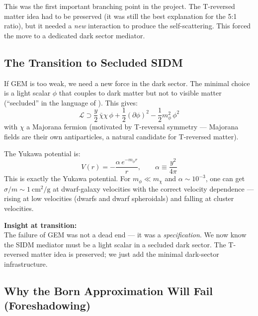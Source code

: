 \documentclass[12pt, a4paper]{article}
\begin{document}
This was the first important branching point in the project. The T-reversed matter idea had to be preserved (it was still the best explanation for the 5:1 ratio), but it needed a \emph{new} interaction to produce the self-scattering. This forced the move to a dedicated dark sector mediator.

\subsection{The Transition to Secluded SIDM}

If GEM is too weak, we need a new force in the dark sector. The minimal choice is a light scalar $\phi$ that couples to dark matter but not to visible matter (``secluded'' in the language of \cite{pospelov2008}). This gives:
\begin{equation}
  \mathcal{L} \supset \frac{y}{2}\,\bar\chi\chi\,\phi + \frac{1}{2}(\partial\phi)^2 - \frac{1}{2}m_\phi^2\,\phi^2
\end{equation}
with $\chi$ a Majorana fermion (motivated by T-reversal symmetry --- Majorana fields are their own antiparticles, a natural candidate for T-reversed matter).

The Yukawa potential is:
\begin{equation}
  V(r) = -\frac{\alpha\,e^{-m_\phi r}}{r}, \qquad \alpha \equiv \frac{y^2}{4\pi}
\end{equation}
This is exactly the Yukawa potential. For $m_\phi \ll m_\chi$ and $\alpha \sim 10^{-3}$, one can get $\sigma/m \sim 1~\text{cm}^2/\text{g}$ at dwarf-galaxy velocities with the correct velocity dependence --- rising at low velocities (dwarfs and dwarf spheroidals) and falling at cluster velocities.

\begin{insightbox}
\textbf{Insight at transition:}\\
The failure of GEM was not a dead end --- it was a \emph{specification}.
We now know the SIDM mediator must be a light scalar in a secluded dark sector.
The T-reversed matter idea is preserved; we just add the minimal dark-sector infrastructure.
\end{insightbox}

\subsection{Why the Born Approximation Will Fail (Foreshadowing)}
\end{document}
